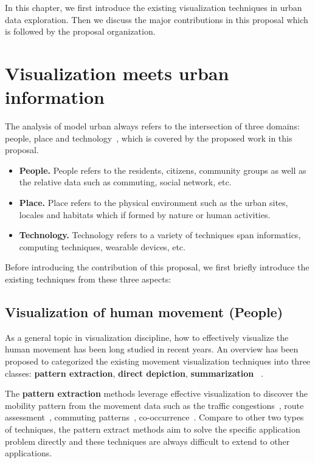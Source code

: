In this chapter, we first introduce the existing visualization techniques in urban data exploration. Then we discuss the major contributions in this proposal which is followed by the proposal organization.

\section{Visualization meets urban information}

 
The analysis of model urban always refers to the intersection of three domains: people, place and technology~\cite{foth2011urban}, which is covered by the proposed work in this proposal. 
\begin{itemize}
\item \textbf{People.} People refers to the residents, citizens, community groups as well as the relative data such as commuting, social network, etc.
\item \textbf{Place.} Place refers to the physical environment such as the urban sites, locales and habitats which if formed by nature or human activities.
\item \textbf{Technology.} Technology refers to a variety of techniques span informatics, computing techniques, wearable devices, etc.
\end{itemize}

Before introducing the contribution of this proposal, we first briefly introduce the existing techniques from these three aspects:

\subsection{Visualization of human movement (People)}
As a general topic in visualization discipline, how to effectively visualize the human movement has been long studied in recent years.  An overview has been proposed to categorized the existing movement visualization techniques into three classes: \textbf{pattern extraction}, \textbf{direct depiction}, \textbf{summarization} ~\cite{andrienko2013visual, wu2015telcovis}.

The \textbf{pattern extraction} methods leverage effective visualization to discover the mobility pattern from the movement data such as the traffic congestions~\cite{wang2013visual}, route assessment~\cite{wang2014visual, huang2015trajgraph}, commuting patterns~\cite{beecham2014studying, von2015mobilitygraphs}, co-occurrence~\cite{wu2015telcovis, ni2017spatio}. Compare to other two types of techniques, the pattern extract methods aim to solve the specific application problem directly and these techniques are always difficult to extend to other applications.

